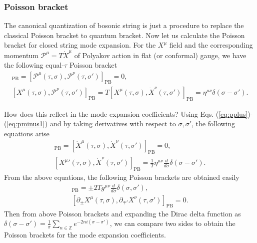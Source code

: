 \documentclass[graybox,envcountchap,sectrefs]{svmono}
\begin{document}
\subsubsection*{Poisson bracket}
The canonical quantization of bosonic string is just a procedure to replace the classical Poisson bracket to quantum bracket. Now let us calculate the Poisson bracket for closed string mode expansion. For the $X^{\mu}$ field and the corresponding momentum $\mathcal{P}^{\mu}=T\dot{X}^{\mu}$ of Polyakov action in flat (or conformal) gauge, we have the following equal-$\tau$ Poisson bracket
\begin{align}
[X^{\mu}(\tau,\sigma),X^{\nu}(\tau,\sigma')]_{\mathrm{PB}}=[\mathcal{P}^{\mu}(\tau,\sigma),\mathcal{P}^{\nu}(\tau,\sigma')]_{\mathrm{PB}}=0,\label{eq:bpx1}\\
[X^{\mu}(\tau,\sigma),\mathcal{P}^{\nu}(\tau,\sigma')]_{\mathrm{PB}}=T[X^{\mu}(\tau,\sigma),\dot{X}^{\nu}(\tau,\sigma')]_{\mathrm{PB}}=\eta^{\mu\nu}\delta(\sigma-\sigma')\label{eq:bpx2}.
\end{align}

How does this reflect in the mode expansion coefficients? Using Eqs. (\ref{eq:pplus})-(\ref{eq:pminus1}) and by taking derivatives with respect to $\sigma,\sigma'$, the following equations arise
\begin{align}
[{X^{\mu}}'(\tau,\sigma),{X^{\nu}}'(\tau,\sigma')]_{\mathrm{PB}}=[{\dot{X}^{\mu}}(\tau,\sigma),{\dot{X}^{\nu}}(\tau,\sigma')]_{\mathrm{PB}}=0,\\
[{X^{\mu}}'(\tau,\sigma),{\dot{X}^{\nu}}(\tau,\sigma')]_{\mathrm{PB}}=\frac{1}{T}\eta^{\mu\nu}\frac{d}{d\sigma}\delta(\sigma-\sigma').
\end{align}
From the above equations, the following Poisson brackets are obtained easily
\begin{align}
[\partial_{\pm}X^{\mu}(\tau,\sigma),\partial_{\pm'}X^{\nu}(\tau,\sigma')]_{\mathrm{PB}}=\pm 2T g^{\mu\nu}\frac{d}{d\sigma}\delta(\sigma,\sigma'),\\
[\partial_{\pm}X^{\mu}(\tau,\sigma),\partial_{\mp'}X^{\nu}(\tau,\sigma')]_{\mathrm{PB}}=0.
\end{align}
Then from above Poisson brackets and expanding the Dirac delta function as $\delta(\sigma-\sigma')=\frac{1}{\pi}\sum_{n\in\mathbb{Z}}e^{-2ni(\sigma-\sigma')}$, we can compare two sides to obtain the Poisson brackets for the mode expansion coefficients.
\end{document}
